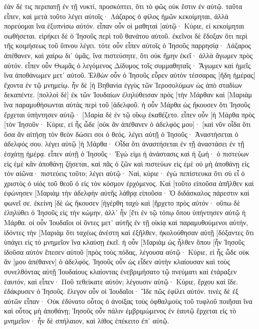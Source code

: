 ἐὰν δέ τις περιπατῇ ἐν τῇ νυκτί, προσκόπτει, ὅτι τὸ φῶς οὐκ ἔστιν ἐν αὐτῷ. 
ταῦτα εἶπεν, καὶ μετὰ τοῦτο λέγει αὐτοῖς· Λάζαρος ὁ φίλος ἡμῶν κεκοίμηται, ἀλλὰ πορεύομαι ἵνα ἐξυπνίσω αὐτόν. 
εἶπαν οὖν οἱ μαθηταὶ [αὐτῷ· Κύριε, εἰ κεκοίμηται σωθήσεται. 
εἰρήκει δὲ ὁ Ἰησοῦς περὶ τοῦ θανάτου αὐτοῦ. ἐκεῖνοι δὲ ἔδοξαν ὅτι περὶ τῆς κοιμήσεως τοῦ ὕπνου λέγει. 
τότε οὖν εἶπεν αὐτοῖς ὁ Ἰησοῦς παρρησίᾳ· Λάζαρος ἀπέθανεν, 
καὶ χαίρω δι᾽ ὑμᾶς, ἵνα πιστεύσητε, ὅτι οὐκ ἤμην ἐκεῖ· ἀλλὰ ἄγωμεν πρὸς αὐτόν. 
εἶπεν οὖν Θωμᾶς ὁ λεγόμενος Δίδυμος τοῖς συμμαθηταῖς· Ἄγωμεν καὶ ἡμεῖς ἵνα ἀποθάνωμεν μετ᾽ αὐτοῦ. 
Ἐλθὼν οὖν ὁ Ἰησοῦς εὗρεν αὐτὸν τέσσαρας [ἤδη ἡμέρας] ἔχοντα ἐν τῷ μνημείῳ. 
ἦν δὲ [ἡ Βηθανία ἐγγὺς τῶν Ἱεροσολύμων ὡς ἀπὸ σταδίων δεκαπέντε. 
[πολλοὶ δὲ] ἐκ τῶν Ἰουδαίων ἐληλύθεισαν πρὸς [τὴν Μάρθαν καὶ [Μαριὰμ ἵνα παραμυθήσωνται αὐτὰς περὶ τοῦ [ἀδελφοῦ. 
ἡ οὖν Μάρθα ὡς ἤκουσεν ὅτι Ἰησοῦς ἔρχεται ὑπήντησεν αὐτῷ· [Μαρία δὲ ἐν τῷ οἴκῳ ἐκαθέζετο. 
εἶπεν οὖν [ἡ Μάρθα πρὸς [τὸν Ἰησοῦν· Κύριε, εἰ ἦς ὧδε [οὐκ ἂν ἀπέθανεν ὁ ἀδελφός μου]· 
[καὶ νῦν οἶδα ὅτι ὅσα ἂν αἰτήσῃ τὸν θεὸν δώσει σοι ὁ θεός. 
λέγει αὐτῇ ὁ Ἰησοῦς· Ἀναστήσεται ὁ ἀδελφός σου. 
λέγει αὐτῷ [ἡ Μάρθα· Οἶδα ὅτι ἀναστήσεται ἐν τῇ ἀναστάσει ἐν τῇ ἐσχάτῃ ἡμέρᾳ. 
εἶπεν αὐτῇ ὁ Ἰησοῦς· Ἐγώ εἰμι ἡ ἀνάστασις καὶ ἡ ζωή· ὁ πιστεύων εἰς ἐμὲ κἂν ἀποθάνῃ ζήσεται, 
καὶ πᾶς ὁ ζῶν καὶ πιστεύων εἰς ἐμὲ οὐ μὴ ἀποθάνῃ εἰς τὸν αἰῶνα· πιστεύεις τοῦτο; 
λέγει αὐτῷ· Ναί, κύριε· ἐγὼ πεπίστευκα ὅτι σὺ εἶ ὁ χριστὸς ὁ υἱὸς τοῦ θεοῦ ὁ εἰς τὸν κόσμον ἐρχόμενος. 
Καὶ [τοῦτο εἰποῦσα ἀπῆλθεν καὶ ἐφώνησεν [Μαριὰμ τὴν ἀδελφὴν αὐτῆς λάθρᾳ εἰποῦσα· Ὁ διδάσκαλος πάρεστιν καὶ φωνεῖ σε. 
ἐκείνη [δὲ ὡς ἤκουσεν [ἠγέρθη ταχὺ καὶ [ἤρχετο πρὸς αὐτόν· 
οὔπω δὲ ἐληλύθει ὁ Ἰησοῦς εἰς τὴν κώμην, ἀλλ᾽ ἦν [ἔτι ἐν τῷ τόπῳ ὅπου ὑπήντησεν αὐτῷ ἡ Μάρθα. 
οἱ οὖν Ἰουδαῖοι οἱ ὄντες μετ᾽ αὐτῆς ἐν τῇ οἰκίᾳ καὶ παραμυθούμενοι αὐτήν, ἰδόντες τὴν [Μαριὰμ ὅτι ταχέως ἀνέστη καὶ ἐξῆλθεν, ἠκολούθησαν αὐτῇ [δόξαντες ὅτι ὑπάγει εἰς τὸ μνημεῖον ἵνα κλαύσῃ ἐκεῖ. 
ἡ οὖν [Μαριὰμ ὡς ἦλθεν ὅπου [ἦν Ἰησοῦς ἰδοῦσα αὐτὸν ἔπεσεν αὐτοῦ [πρὸς τοὺς πόδας, λέγουσα αὐτῷ· Κύριε, εἰ ἦς ὧδε οὐκ ἄν [μου ἀπέθανεν] ὁ ἀδελφός. 
Ἰησοῦς οὖν ὡς εἶδεν αὐτὴν κλαίουσαν καὶ τοὺς συνελθόντας αὐτῇ Ἰουδαίους κλαίοντας ἐνεβριμήσατο τῷ πνεύματι καὶ ἐτάραξεν ἑαυτόν, 
καὶ εἶπεν· Ποῦ τεθείκατε αὐτόν; λέγουσιν αὐτῷ· Κύριε, ἔρχου καὶ ἴδε. 
ἐδάκρυσεν ὁ Ἰησοῦς. 
ἔλεγον οὖν οἱ Ἰουδαῖοι· Ἴδε πῶς ἐφίλει αὐτόν. 
τινὲς δὲ ἐξ αὐτῶν εἶπαν· Οὐκ ἐδύνατο οὗτος ὁ ἀνοίξας τοὺς ὀφθαλμοὺς τοῦ τυφλοῦ ποιῆσαι ἵνα καὶ οὗτος μὴ ἀποθάνῃ; 
Ἰησοῦς οὖν πάλιν ἐμβριμώμενος ἐν ἑαυτῷ ἔρχεται εἰς τὸ μνημεῖον· ἦν δὲ σπήλαιον, καὶ λίθος ἐπέκειτο ἐπ᾽ αὐτῷ. 
